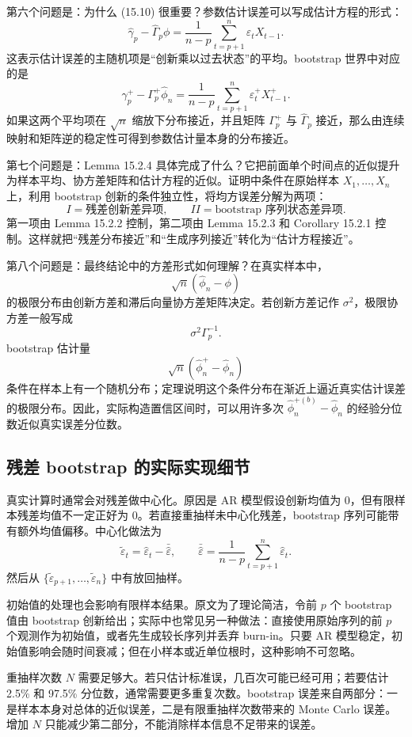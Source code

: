 \documentclass[11pt,a4paper,openany]{ctexbook}
\begin{document}
第六个问题是：为什么 (15.10) 很重要？参数估计误差可以写成估计方程的形式：
\[
  \hat\gamma_p-\hat\Gamma_p\phi
  =\frac1{n-p}\sum_{t=p+1}^n\varepsilon_tX_{t-1}.
\]
这表示估计误差的主随机项是“创新乘以过去状态”的平均。bootstrap 世界中对应的是
\[
  \gamma_p^+-\Gamma_p^+\hat\phi_n
  =\frac1{n-p}\sum_{t=p+1}^n\varepsilon_t^+X_{t-1}^+.
\]
如果这两个平均项在 \(\sqrt n\) 缩放下分布接近，并且矩阵 \(\Gamma_p^+\) 与 \(\hat\Gamma_p\) 接近，那么由连续映射和矩阵逆的稳定性可得到参数估计量本身的分布接近。

第七个问题是：Lemma 15.2.4 具体完成了什么？它把前面单个时间点的近似提升为样本平均、协方差矩阵和估计方程的近似。证明中条件在原始样本 \(X_1,\ldots,X_n\) 上，利用 bootstrap 创新的条件独立性，将均方误差分解为两项：
\[
  I=\text{残差创新差异项},\qquad
  II=\text{bootstrap 序列状态差异项}.
\]
第一项由 Lemma 15.2.2 控制，第二项由 Lemma 15.2.3 和 Corollary 15.2.1 控制。这样就把“残差分布接近”和“生成序列接近”转化为“估计方程接近”。

第八个问题是：最终结论中的方差形式如何理解？在真实样本中，
\[
  \sqrt n(\hat\phi_n-\phi)
\]
的极限分布由创新方差和滞后向量协方差矩阵决定。若创新方差记作 \(\sigma^2\)，极限协方差一般写成
\[
  \sigma^2\Gamma_p^{-1}.
\]
bootstrap 估计量
\[
  \sqrt n(\hat\phi_n^+-\hat\phi_n)
\]
条件在样本上有一个随机分布；定理说明这个条件分布在渐近上逼近真实估计误差的极限分布。因此，实际构造置信区间时，可以用许多次 \(\hat\phi_n^{+(b)}-\hat\phi_n\) 的经验分位数近似真实误差分位数。

\subsection{残差 bootstrap 的实际实现细节}

真实计算时通常会对残差做中心化。原因是 AR 模型假设创新均值为 0，但有限样本残差均值不一定正好为 0。若直接重抽样未中心化残差，bootstrap 序列可能带有额外均值偏移。中心化做法为
\[
  \tilde\varepsilon_t=\hat\varepsilon_t-\bar{\hat\varepsilon},
  \qquad
  \bar{\hat\varepsilon}=\frac1{n-p}\sum_{t=p+1}^n\hat\varepsilon_t.
\]
然后从 \(\{\tilde\varepsilon_{p+1},\ldots,\tilde\varepsilon_n\}\) 中有放回抽样。

初始值的处理也会影响有限样本结果。原文为了理论简洁，令前 \(p\) 个 bootstrap 值由 bootstrap 创新给出；实际中也常见另一种做法：直接使用原始序列的前 \(p\) 个观测作为初始值，或者先生成较长序列并丢弃 burn-in。只要 AR 模型稳定，初始值影响会随时间衰减；但在小样本或近单位根时，这种影响不可忽略。

重抽样次数 \(N\) 需要足够大。若只估计标准误，几百次可能已经可用；若要估计 2.5\% 和 97.5\% 分位数，通常需要更多重复次数。bootstrap 误差来自两部分：一是样本本身对总体的近似误差，二是有限重抽样次数带来的 Monte Carlo 误差。增加 \(N\) 只能减少第二部分，不能消除样本信息不足带来的误差。
\end{document}
